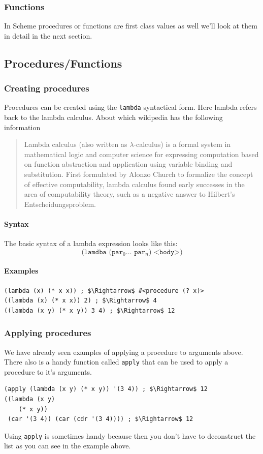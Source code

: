 \documentclass[12pt,a4paper,english,twoside]{article}
\begin{document}
\subsubsection{Functions}
In Scheme procedures or functions are first class values as well we'll look at 
them in detail in the next section.
\subsection{Procedures/Functions}
\subsubsection{Creating procedures}
Procedures can be created using the \texttt{lambda} syntactical form. Here lambda refers back to the lambda calculus. About which wikipedia \cite{lambda} has the following information
\begin{quotation}
Lambda calculus (also written as $\lambda$-calculus) is a formal system in mathematical logic and computer science for expressing computation based on function abstraction and application using variable binding and substitution. First formulated by Alonzo Church to formalize the concept of effective computability, lambda calculus found early successes in the area of computability theory, such as a negative answer to Hilbert's Entscheidungsproblem.
\end{quotation}
\paragraph{Syntax}
The basic syntax of a lambda expression looks like this:
\begin{equation*}
\texttt{(lamdba (par$_{0} \dots$ par$_{n}$) <body>)}
\end{equation*}
\paragraph{Examples}
\begin{lstlisting}
(lambda (x) (* x x)) ; $\Rightarrow$ #<procedure (? x)>
((lambda (x) (* x x)) 2) ; $\Rightarrow$ 4 
((lambda (x y) (* x y)) 3 4) ; $\Rightarrow$ 12 
\end{lstlisting}
\subsubsection{Applying procedures}
We have already seen examples of applying a procedure to arguments above. There also is a handy function called \texttt{apply} that can be used to apply a procedure to it's arguments.
\begin{lstlisting}
(apply (lambda (x y) (* x y)) '(3 4)) ; $\Rightarrow$ 12
((lambda (x y) 
    (* x y)) 
 (car '(3 4)) (car (cdr '(3 4)))) ; $\Rightarrow$ 12
\end{lstlisting} 
Using \texttt{apply} is sometimes handy because then you don't have to deconstruct the list as you can see in the example above.
\end{document}
